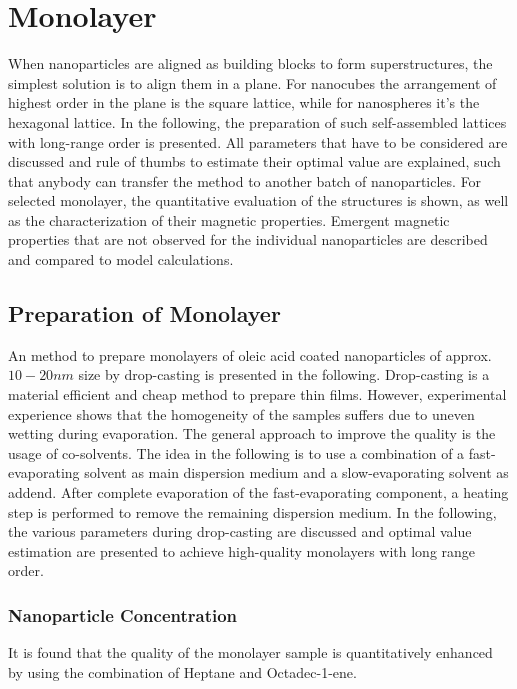 \documentclass[\main/dresen_thesis.tex]{subfiles}
\begin{document}
\chapter{Monolayer}\label{ch:monolayers}
When nanoparticles are aligned as building blocks to form superstructures, the simplest solution is to align them in a plane. 
For nanocubes the arrangement of highest order in the plane is the square lattice, while for nanospheres it's the hexagonal lattice.
In the following, the preparation of such self-assembled lattices with long-range order is presented.
All parameters that have to be considered are discussed and rule of thumbs to estimate their optimal value are explained, such that anybody can transfer the method to another batch of nanoparticles.
For selected monolayer, the quantitative evaluation of the structures is shown, as well as the characterization of their magnetic properties. Emergent magnetic properties that are not observed for the individual nanoparticles are described and compared to model calculations.


\section{Preparation of Monolayer}
An method to prepare monolayers of oleic acid coated nanoparticles of approx. $10 - 20 \unit{nm}$ size by drop-casting is presented in the following. 
Drop-casting is a material efficient and cheap method to prepare thin films. 
However, experimental experience shows that the homogeneity of the samples suffers due to uneven wetting during evaporation. 
The general approach to improve the quality is the usage of co-solvents. 
The idea in the following is to use a combination of a fast-evaporating solvent as main dispersion medium and a slow-evaporating solvent as addend.
After complete evaporation of the fast-evaporating component, a heating step is performed to remove the remaining dispersion medium.
In the following, the various parameters during drop-casting are discussed and optimal value estimation are presented to achieve high-quality monolayers with long range order.

\subsection{Nanoparticle Concentration}

It is found that the quality of the monolayer sample is quantitatively enhanced by using the combination of Heptane and Octadec-1-ene.
\end{document}
